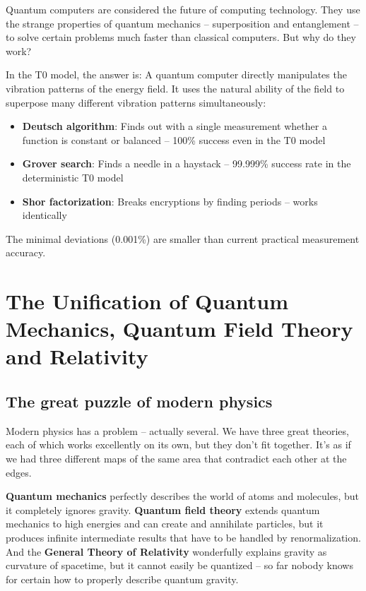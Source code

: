 	Quantum computers are considered the future of computing technology. They use the strange properties of quantum mechanics -- superposition and entanglement -- to solve certain problems much faster than classical computers. But why do they work?
	
	\begin{experimental}
		In the T0 model, the answer is: A quantum computer directly manipulates the vibration patterns of the energy field. It uses the natural ability of the field to superpose many different vibration patterns simultaneously:
		
		\begin{itemize}
			\item \textbf{Deutsch algorithm}: Finds out with a single measurement whether a function is constant or balanced -- 100\% success even in the T0 model
			\item \textbf{Grover search}: Finds a needle in a haystack -- 99.999\% success rate in the deterministic T0 model
			\item \textbf{Shor factorization}: Breaks encryptions by finding periods -- works identically
		\end{itemize}
		
		The minimal deviations (0.001\%) are smaller than current practical measurement accuracy.
	\end{experimental}
	
	\section{The Unification of Quantum Mechanics, Quantum Field Theory and Relativity}
	
	\subsection{The great puzzle of modern physics}
	
	Modern physics has a problem -- actually several. We have three great theories, each of which works excellently on its own, but they don't fit together. It's as if we had three different maps of the same area that contradict each other at the edges.
	
	\textbf{Quantum mechanics} perfectly describes the world of atoms and molecules, but it completely ignores gravity. \textbf{Quantum field theory} extends quantum mechanics to high energies and can create and annihilate particles, but it produces infinite intermediate results that have to be handled by renormalization. And the \textbf{General Theory of Relativity} wonderfully explains gravity as curvature of spacetime, but it cannot easily be quantized -- so far nobody knows for certain how to properly describe quantum gravity.
	

